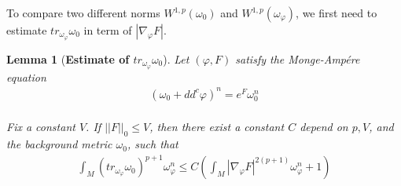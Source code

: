 \documentclass[11pt]{amsart}
\newtheorem{lem}{Lemma}[section]
\numberwithin{equation}{section}
\begin{document}
\noindent
To compare two different norms $W^{1,p}(\omega_0)$ and $W^{1,p}(\omega_\varphi)$, we first need to estimate $tr_{\omega_{\varphi}}\omega_0$ in term of $|\nabla_\varphi F|$. \\



\begin{lem}[\textbf{Estimate of $tr_{\omega_{\varphi}}\omega_0$}]\label{Lem31}
	Let $(\varphi,F)$ satisfy the Monge-Amp\'ere equation 
	\begin{align}
		(\omega_0+dd^c \varphi)^n=e^F \omega_0^n
	\end{align}\\
	Fix a constant $V$. If $||F||_0 \le  V$, then there exist a constant $C$ depend on $p,V$, and the background metric $\omega_0$, such that
	\begin{align}
		\int_M (tr_{\omega_{\varphi}}\omega_0)^{p+1}\omega_\varphi^n \le  C\left( \int_M |\nabla_\varphi F|^{2(p+1)}\omega_\varphi^n +1 \right)
	\end{align}\\
\end{lem}
\end{document}
